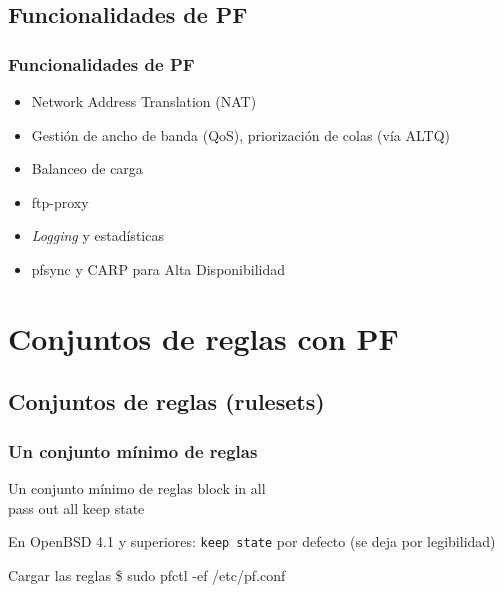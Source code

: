 \documentclass{beamer}
\begin{document}
\subsection{Funcionalidades de PF}
\begin{frame}
\frametitle{Funcionalidades de PF}

\begin{itemize}
\item Network Address Translation (NAT) 
\item Gestión de ancho de banda (QoS), priorización de colas (vía ALTQ)
\item Balanceo de carga
\item ftp-proxy  
\item \textit{Logging} y estadísticas
\item pfsync y CARP para Alta Disponibilidad
\end{itemize}

\end{frame}


\section{Conjuntos de reglas con PF}
\subsection{Conjuntos de reglas (rulesets)}

\begin{frame}
\frametitle{Un conjunto mínimo de reglas}

\begin{block}{Un conjunto mínimo de reglas}
block in all \\
pass out all keep state
\end{block}

En OpenBSD 4.1 y superiores: \texttt{keep state} por defecto (se deja por legibilidad)

\begin{block}{Cargar las reglas}
\$ sudo pfctl -ef /etc/pf.conf
\end{block}


\end{frame}


\end{document}
